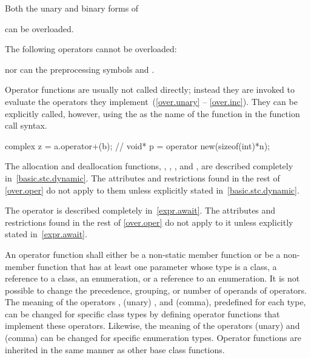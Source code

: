 \pnum
Both the unary and binary forms of
\begin{ncsimplebnf}\obeyspaces
\terminal{+      -      *      \&}
\end{ncsimplebnf}
can be overloaded.

\pnum
\begin{note}
%
The following operators cannot be overloaded:
\begin{ncsimplebnf}\obeyspaces
{}
\end{ncsimplebnf}
nor can the preprocessing symbols
\tcode{\#}
and
\tcode{\#\#}.
\end{note}

\pnum
{}%
Operator functions are usually not called directly; instead they are invoked
to evaluate the operators they implement~(\ref{over.unary} -- \ref{over.inc}).
They can be explicitly called, however, using the
as the name of the function in the function call syntax.
\begin{example}
\begin{codeblock}
complex z = a.operator+(b);     // 
void* p = operator new(sizeof(int)*n);
\end{codeblock}
\end{example}

\pnum
The allocation and deallocation functions,
 ,
 ,
 , and
 ,
are described completely in~\ref{basic.stc.dynamic}.
The attributes and restrictions
found in the rest of \ref{over.oper} do not apply to them unless explicitly
stated in~\ref{basic.stc.dynamic}.

\pnum
The  operator is described completely in~\ref{expr.await}.
The attributes and restrictions
found in the rest of \ref{over.oper} do not apply to it unless explicitly
stated in~\ref{expr.await}.

\pnum
{}%
An operator function
shall either be a non-static member function or be a non-member function that
has at least one parameter whose type is a class, a reference to a class, an
enumeration, or a reference to an enumeration.
It is not possible to change the precedence, grouping, or number of operands
of operators.
The meaning of
the operators \tcode{=}, (unary) \tcode{\&}, and \tcode{,} (comma),
predefined for each type, can be changed for specific class types by
defining operator functions that implement these operators.
Likewise, the meaning of the operators (unary) \tcode{\&} and \tcode{,} (comma)
can be changed for specific enumeration types.
%
Operator functions are inherited in the same manner as other base class
functions.


